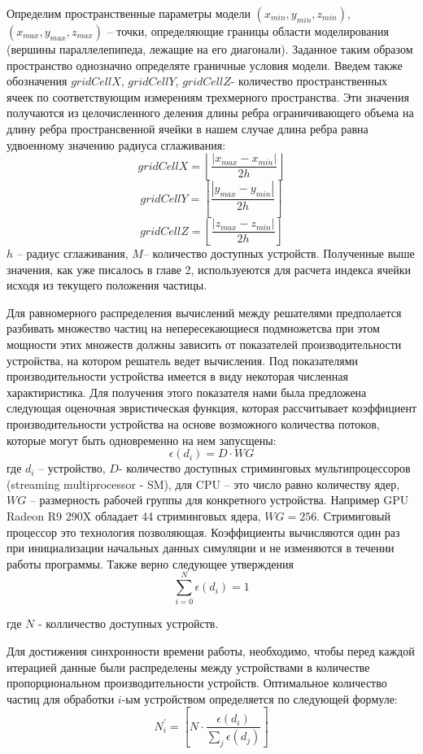 Определим пространственные параметры модели
\((x_{min}, y_{min}, z_{min})\), \((x_{max}, y_{max}, z_{max})\) – точки, определяющие границы области моделирования (вершины параллелепипеда, лежащие на его диагонали). Заданное таким образом пространство однозначно определяте граничные условия модели. Введем также обозначения \(gridCellX\), \(gridCellY\), \(gridCellZ\)- количество пространственных ячеек по соответствующим измерениям трехмерного пространства. Эти значения получаются из целочисленного деления длины ребра ограничивающего объема на длину ребра пространсвенной ячейки в нашем случае длина ребра равна удвоенному значению радиуса сглаживания:
\[
  gridCellX = \left \lfloor \frac{\left |x_{max} - x_{min}  \right |}{2h} \right \rfloor
\]
\[
  gridCellY = \left \lfloor \frac{\left |y_{max} - y_{min}  \right |}{2h} \right \rfloor
\]
\[
  gridCellZ = \left \lfloor \frac{\left |z_{max} - z_{min}  \right |}{2h} \right \rfloor
\]
\(h\) – радиус сглаживания,
\(M\)– количество доступных устройств.
Полученные выше значения, как уже писалось в главе 2, используеются для расчета индекса ячейки исходя из текущего положения частицы.

Для равномерного распределения вычислений между решателями предполается разбивать множество частиц на непересекающиеся подмножетсва при этом мощности этих множеств должны зависить от показателей производительности устройства, на котором решатель ведет вычисления. Под показателями производительности устройства имеется в виду некоторая численная характиристика. Для получения этого показателя нами была предложена следующая оценочная эвристическая функция, которая рассчитывает коэффициент производительности устройства на основе возможного количества потоков, которые могут быть одновременно на нем запусщены:
\[
  \epsilon(d_i)=D \cdot WG
\]
где \(d_i\) – устройство, \(D\)- количество доступных стриминговых мультипроцессоров (streaming multiprocessor - SM), для CPU – это число равно количеству ядер, \(WG\) – размерность рабочей группы для конкретного устройства. Например GPU Radeon R9 290X обладает 44 стриминговых ядера, \(WG=256\). Стримиговый процессор это технология позволяющая. Коэффициенты вычисляются один раз при инициализации начальных данных симуляции и не изменяются в течении работы программы. Также верно следующее утверждения
\[
  \sum_{i=0}^{N}\epsilon(d_i) = 1
\]

где \(N\) - колличество доступных устройств.

Для достижения синхронности времени работы, необходимо, чтобы перед каждой итерацией данные были распределены между устройствами в количестве пропорциональном производительности устройств. Оптимальное количество частиц для обработки \(i\)-ым устройством определяется по следующей формуле:
\[
  N_{i}^{'}=\left [ N \cdot \frac{\epsilon(d_i)}{\sum_{j}\epsilon(d_j)} \right ]
\]


